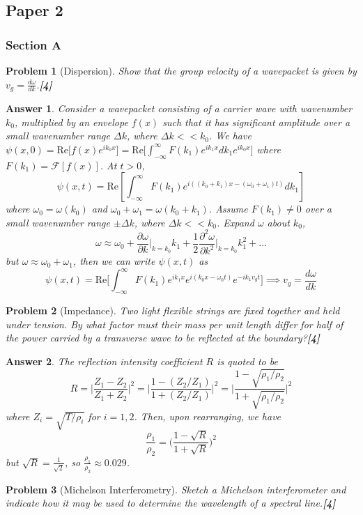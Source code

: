 \documentclass[a4paper]{article}
\newtheorem{ans}{Answer}[subsection]
\theoremstyle{new}
\newtheorem{qns}{Problem}[subsection]
\begin{document}
\subsection{Paper 2}
\subsubsection{Section A}
\begin{qns}[Dispersion]
Show that the group velocity of a wavepacket is given by $v_g=\frac{d\omega}{dk}$.\hfill\textbf{[4]}
\end{qns}
\begin{ans}
Consider a wavepacket consisting of a carrier wave with wavenumber $k_0$, multiplied by an envelope $f(x)$ such that it has significant amplitude over a small wavenumber range $\Delta k$, where $\Delta k<<k_0$. We have $\psi(x,0)=\text{Re}\bigg[f(x)e^{ik_0x}]=\text{Re}[\int_{-\infty}^\infty F(k_1)e^{ik_1x}dk_1e^{ik_0x}\bigg]$ where $F(k_1)=\mathcal{F}[f(x)]$. At $t>0$,
$$\psi(x,t)=\text{Re}[\int_{-\infty}^\infty F(k_1)e^{i((k_0+k_1)x-(\omega_0+\omega_1)t)}dk_1]$$
where $\omega_0=\omega(k_0)$ and $\omega_0+\omega_1=\omega(k_0+k_1)$. Assume $F(k_1)\neq 0$ over a small wavenumber range $\pm\Delta k$, where $\Delta k<<k_0$. Expand $\omega$ about $k_0$,
$$\omega\approx\omega_0+\frac{\partial\omega}{\partial k}\bigg|_{k=k_0}k_1+\frac{1}{2}\frac{\partial^2\omega}{\partial k^2}\bigg|_{k=k_0}k_1^2+...$$
but $\omega\approx\omega_0+\omega_1$, then we can write $\psi(x,t)$ as
$$\psi(x,t)=\text{Re}\bigg[\int_{-\infty}^\infty F(k_1)e^{ik_1x}e^{i(k_0x-\omega_0t)}e^{-ik_1v_gt}\bigg]\implies v_g=\frac{d\omega}{dk}$$
\end{ans}
\begin{qns}[Impedance]
Two light flexible strings are fixed together and held under tension. By what factor must their mass per unit length differ for half of the power carried by a transverse wave to be reflected at the boundary?\hfill\textbf{[4]}
\end{qns}
\begin{ans}
The reflection intensity coefficient $R$ is quoted to be
$$R=\bigg|\frac{Z_1-Z_2}{Z_1+Z_2}\bigg|^2=\bigg|\frac{1-(Z_2/Z_1)}{1+(Z_2/Z_1)}\bigg|^2=\bigg|\frac{1-\sqrt{\rho_1/\rho_2}}{1+\sqrt{\rho_1/\rho_2}}\bigg|^2$$
where $Z_i=\sqrt{T/\rho_i}$ for $i=1,2$. Then, upon rearranging, we have
$$\frac{\rho_1}{\rho_2}=\bigg(\frac{1-\sqrt{R}}{1+\sqrt{R}}\bigg)^2$$
but $\sqrt{R}=\frac{1}{\sqrt{2}}$, so $\frac{\rho_1}{\rho_2}\approx 0.029$. 
\end{ans}
\begin{qns}[Michelson Interferometry]
Sketch a Michelson interferometer and indicate how it may be used to determine the wavelength of a spectral line.\hfill\textbf{[4]}
\end{qns}
\end{document}
